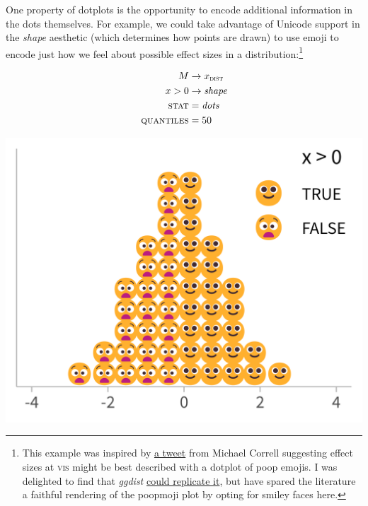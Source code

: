 \documentclass[journal]{vgtc}              %
\begin{document}
One property of dotplots is the opportunity to encode additional information in the dots themselves. For example, we could take advantage of Unicode support in the \textit{shape} aesthetic (which determines how points are drawn) to use emoji to encode just how we feel about possible effect sizes in a distribution:\footnote{This example was inspired by \href{https://twitter.com/Birdbassador/status/916332327696875520}{a tweet} from Michael Correll suggesting effect sizes at \textsc{vis} might be best described with a dotplot of poop emojis. I was delighted to find that \textit{ggdist} \href{https://twitter.com/mjskay/status/1361366253424832512}{could replicate it}, but have spared the literature a faithful rendering of the poopmoji plot by opting for smiley faces here.}


\noindent
\begin{minipage}{.5\columnwidth}

\begin{align*}
M &\rightarrow x_\textsc{dist}\\
x > 0 &\rightarrow \textit{shape}\\
\textsc{stat} &= \mathit{dots}\\
\textsc{quantiles} &= 50
\end{align*}
\end{minipage}%
  \begin{minipage}{.4\columnwidth}
    \centering
    \includegraphics[width=1.2\columnwidth]{figs/3-dots_emoji.png}
  \end{minipage}
\hfill\break
\end{document}
